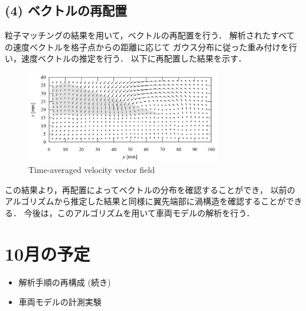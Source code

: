 \documentclass[twocolumn,a4j]{jsarticle}
\begin{document}
\subsection{(4) ベクトルの再配置}
粒子マッチングの結果を用いて，ベクトルの再配置を行う．
解析されたすべての速度ベクトルを格子点からの距離に応じて
ガウス分布に従った重み付けを行い，速度ベクトルの推定を行う．
以下に再配置した結果を示す．

\begin{figure}[htbp]
	\includegraphics[keepaspectratio, width=85mm]{../images/time-averaged_velocity.png}
	\caption{Time-averaged velocity vector field}
\end{figure}

この結果より，再配置によってベクトルの分布を確認することができ，
以前のアルゴリズムから推定した結果と同様に翼先端部に渦構造を確認することができる．
今後は，このアルゴリズムを用いて車両モデルの解析を行う．

\section{10月の予定}
\begin{itemize}
	\item 解析手順の再構成 (続き)
	\item 車両モデルの計測実験
\end{itemize}
\end{document}
